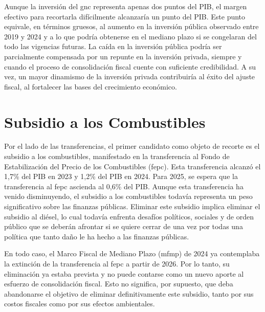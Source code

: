 Aunque la inversión del \gls{gnc} representa apenas dos puntos del PIB, el margen efectivo para recortarla difícilmente alcanzaría un punto del PIB. Este punto equivale, en términos gruesos, al aumento en la inversión pública observado entre 2019 y 2024 y a lo que podría obtenerse en el mediano plazo si se congelaran del todo las vigencias futuras. La caída en la inversión pública podría ser parcialmente compensada por un repunte en la inversión privada, siempre y cuando el proceso de consolidación fiscal cuente con suficiente credibilidad. A su vez, un mayor dinamismo de la inversión privada contribuiría al éxito del ajuste fiscal, al fortalecer las bases del crecimiento económico.



\section{Subsidio a los Combustibles}


Por el lado de las transferencias, el primer candidato como objeto de recorte es el subsidio a los combustibles, manifestado en la transferencia al Fondo de Estabilización del Precio de los Combustibles (\gls{fepc}). Esta transferencia alcanzó el 1,7\% del PIB en 2023 y 1,2\% del PIB en 2024. Para 2025, se espera que la transferencia al \gls{fepc} ascienda al 0,6\% del PIB. Aunque esta transferencia ha venido disminuyendo, el subsidio a los combustibles todavía representa un peso significativo sobre las finanzas públicas. Eliminar este subsidio implica eliminar el subsidio al diésel, lo cual todavía enfrenta desafíos políticos, sociales y de orden público que se deberán afrontar si se quiere cerrar de una vez por todas una política que tanto daño le ha hecho a las finanzas públicas. 

En todo caso, el Marco Fiscal de Mediano Plazo (\gls{mfmp}) de 2024 ya contemplaba la extinción de la transferencia al \gls{fepc} a partir de 2026. Por lo tanto, su eliminación ya estaba prevista y no puede contarse como un nuevo aporte al esfuerzo de consolidación fiscal. Esto no significa, por supuesto, que deba abandonarse el objetivo de eliminar definitivamente este subsidio, tanto por sus costos fiscales como por sus efectos ambientales.

